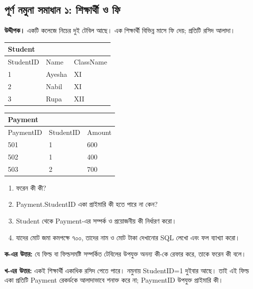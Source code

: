 \subsection{পূর্ণ নমুনা সমাধান ১: শিক্ষার্থী ও ফি}
\textbf{উদ্দীপক।} একটি কলেজে নিচের দুই টেবিল আছে। এক শিক্ষার্থী বিভিন্ন মাসে ফি দেয়; প্রতিটি রসিদ আলাদা।
\begin{flushleft}
\small
\begin{tabular}{|l|l|l|}\hline
\multicolumn{3}{|l|}{Student}\\ \hline
StudentID & Name & ClassName\\ \hline
1 & Ayesha & XI\\\hline
2 & Nabil & XI\\\hline
3 & Rupa & XII\\ \hline
\end{tabular}
\qquad
\begin{tabular}{|l|l|l|}\hline
\multicolumn{3}{|l|}{Payment}\\ \hline
PaymentID & StudentID & Amount\\ \hline
501 & 1 & 600\\\hline
502 & 1 & 400\\\hline
503 & 2 & 700\\ \hline
\end{tabular}
\end{flushleft}
\begin{enumerate}
\item[ক.] ফরেন কী কী?
\item[খ.] Payment.StudentID একা প্রাইমারি কী হতে পারে না কেন?
\item[গ.] Student থেকে Payment-এর সম্পর্ক ও প্রয়োজনীয় কী নির্ধারণ করো।
\item[ঘ.] যাদের মোট জমা কমপক্ষে ৭০০, তাদের নাম ও মোট টাকা দেখানোর SQL লেখো এবং ফল ব্যাখ্যা করো।
\end{enumerate}
\textbf{ক-এর উত্তর:} যে ফিল্ড বা ফিল্ডসমষ্টি সম্পর্কিত টেবিলের উপযুক্ত অনন্য কী-কে রেফার করে, তাকে ফরেন কী বলে।

\textbf{খ-এর উত্তর:} একই শিক্ষার্থী একাধিক রসিদ পেতে পারে। নমুনায় StudentID=1 দুইবার আছে। তাই এই ফিল্ড একা প্রতিটি Payment রেকর্ডকে আলাদাভাবে শনাক্ত করে না; PaymentID উপযুক্ত প্রাইমারি কী।


